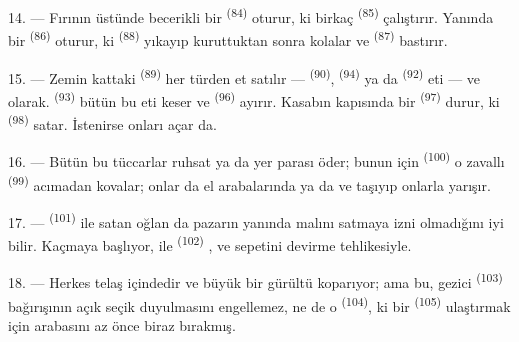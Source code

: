 14. --- Fırının üstünde becerikli bir 
\textsuperscript{(84)} oturur, ki birkaç 
\textsuperscript{(85)} çalıştırır. Yanında bir  \textsuperscript{(86)} oturur, ki 
\textsuperscript{(88)} yıkayıp kuruttuktan sonra kolalar ve 
\textsuperscript{(87)} bastırır.

\VUsaut{4.0mm}
\VUsaut{3.0mm}

15. --- Zemin kattaki  \textsuperscript{(89)} her
türden et satılır ---  \textsuperscript{(90)}, 
\textsuperscript{(94)} ya da  \textsuperscript{(92)} eti ---
 ve  olarak. 
\textsuperscript{(93)} bütün bu eti keser ve 
\textsuperscript{(96)} ayırır. Kasabın kapısında bir  \textsuperscript{(97)} durur, ki 
\textsuperscript{(98)} satar. İstenirse onları açar da.

16. --- Bütün bu tüccarlar ruhsat ya da yer parası öder; bunun için
 \textsuperscript{(100)} o zavallı  \textsuperscript{(99)} acımadan kovalar; onlar da el arabalarında
 ya da  ve  taşıyıp onlarla
yarışır.

\VUsaut{4.0mm}
\VUsaut{3.0mm}

17. ---  \textsuperscript{(101)} ile  satan
oğlan da pazarın yanında malını satmaya izni olmadığını iyi bilir. Kaçmaya
başlıyor,  ile  
\textsuperscript{(102)} ,  ve
 sepetini devirme tehlikesiyle.

18. --- Herkes telaş içindedir ve büyük bir gürültü koparıyor; ama bu, gezici
 \textsuperscript{(103)} bağırışının açık seçik duyulmasını
engellemez, ne de o  \textsuperscript{(104)}, ki bir
 \textsuperscript{(105)} ulaştırmak için arabasını az önce
biraz bırakmış.
\VUsaut{6.0mm}
\VUfilet{22mm}
